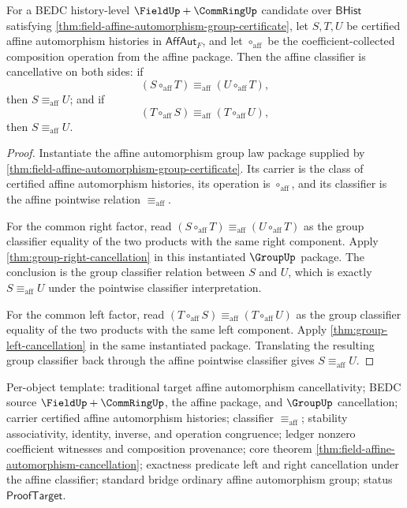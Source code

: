 \begin{theorem}
\label{thm:field-affine-automorphism-cancellation}
For a BEDC history-level $\FieldUp+\CommRingUp$ candidate over
$\mathsf{BHist}$ satisfying
\autoref{thm:field-affine-automorphism-group-certificate}, let $S,T,U$ be
certified affine automorphism histories in $\mathsf{AffAut}_F$, and let
$\circ_{\mathrm{aff}}$ be the coefficient-collected composition operation from
the affine package. Then the affine classifier is cancellative on both sides:
if
$$
(S\circ_{\mathrm{aff}}T)\equiv_{\mathrm{aff}}(U\circ_{\mathrm{aff}}T),
$$
then $S\equiv_{\mathrm{aff}}U$; and if
$$
(T\circ_{\mathrm{aff}}S)\equiv_{\mathrm{aff}}(T\circ_{\mathrm{aff}}U),
$$
then $S\equiv_{\mathrm{aff}}U$.
\end{theorem}
\begin{proof}
Instantiate the affine automorphism group law package supplied by
\autoref{thm:field-affine-automorphism-group-certificate}. Its carrier is the
class of certified affine automorphism histories, its operation is
$\circ_{\mathrm{aff}}$, and its classifier is the affine pointwise relation
$\equiv_{\mathrm{aff}}$.

For the common right factor, read
$(S\circ_{\mathrm{aff}}T)\equiv_{\mathrm{aff}}(U\circ_{\mathrm{aff}}T)$ as the
group classifier equality of the two products with the same right component.
Apply \autoref{thm:group-right-cancellation} in this instantiated
$\GroupUp$ package. The conclusion is the group classifier relation between
$S$ and $U$, which is exactly $S\equiv_{\mathrm{aff}}U$ under the pointwise
classifier interpretation.

For the common left factor, read
$(T\circ_{\mathrm{aff}}S)\equiv_{\mathrm{aff}}(T\circ_{\mathrm{aff}}U)$ as the
group classifier equality of the two products with the same left component.
Apply \autoref{thm:group-left-cancellation} in the same instantiated package.
Translating the resulting group classifier back through the affine pointwise
classifier gives $S\equiv_{\mathrm{aff}}U$.
\end{proof}

Per-object template: traditional target affine automorphism cancellativity;
BEDC source $\FieldUp+\CommRingUp$, the affine package, and $\GroupUp$
cancellation; carrier certified affine automorphism histories; classifier
$\equiv_{\mathrm{aff}}$; stability associativity, identity, inverse, and
operation congruence; ledger nonzero coefficient witnesses and composition
provenance; core theorem
\autoref{thm:field-affine-automorphism-cancellation}; exactness predicate left
and right cancellation under the affine classifier; standard bridge ordinary
affine automorphism group; status $\mathsf{ProofTarget}$.

